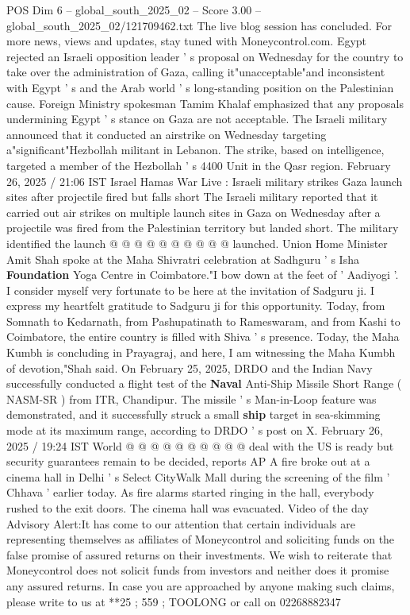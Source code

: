 \begin{textsample}{POS Dim 6 – global\_south\_2025\_02 – Score 3.00 – global\_south\_2025\_02/121709462.txt}  \label{ex:f6_pos_413}
The live blog session has concluded.
For more news, views and updates, stay tuned with Moneycontrol.com.
Egypt rejected an Israeli opposition leader ' s proposal on Wednesday for the country to take over the administration of Gaza, calling it"unacceptable"and inconsistent with Egypt ' s and the Arab world ' s long-standing position on the Palestinian cause.
Foreign Ministry spokesman Tamim Khalaf emphasized that any proposals undermining Egypt ' s stance on Gaza are not acceptable.
The Israeli military announced that it conducted an airstrike on Wednesday targeting a"significant"Hezbollah militant in Lebanon.
The strike, based on intelligence, targeted a member of the Hezbollah ' s 4400 Unit in the Qasr region.
February 26, 2025 / 21:06 IST Israel Hamas War Live : Israeli military strikes Gaza launch sites after projectile fired but falls short The Israeli military reported that it carried out air strikes on multiple launch sites in Gaza on Wednesday after a projectile was fired from the Palestinian territory but landed short.
The military identified the launch @ @ @ @ @ @ @ @ @ @ launched.
Union Home Minister Amit Shah spoke at the Maha Shivratri celebration at Sadhguru ' s Isha \textbf{Foundation} Yoga Centre in Coimbatore."I bow down at the feet of ' Aadiyogi '.
I consider myself very fortunate to be here at the invitation of Sadguru ji.
I express my heartfelt gratitude to Sadguru ji for this opportunity.
Today, from Somnath to Kedarnath, from Pashupatinath to Rameswaram, and from Kashi to Coimbatore, the entire country is filled with Shiva ' s presence.
Today, the Maha Kumbh is concluding in Prayagraj, and here, I am witnessing the Maha Kumbh of devotion,"Shah said.
On February 25, 2025, DRDO and the Indian Navy successfully conducted a flight test of the \textbf{Naval} Anti-Ship Missile Short Range ( NASM-SR ) from ITR, Chandipur.
The missile ' s Man-in-Loop feature was demonstrated, and it successfully struck a small \textbf{ship} target in sea-skimming mode at its maximum range, according to DRDO ' s post on X.
February 26, 2025 / 19:24 IST World @ @ @ @ @ @ @ @ @ @ deal with the US is ready but security guarantees remain to be decided, reports AP A fire broke out at a cinema hall in Delhi ' s Select CityWalk Mall during the screening of the film ' Chhava ' earlier today.
As fire alarms started ringing in the hall, everybody rushed to the exit doors.
The cinema hall was evacuated.
Video of the day Advisory Alert:It has come to our attention that certain individuals are representing themselves as affiliates of Moneycontrol and soliciting funds on the false promise of assured returns on their investments.
We wish to reiterate that Moneycontrol does not solicit funds from investors and neither does it promise any assured returns.
In case you are approached by anyone making such claims, please write to us at **25 ; 559 ; TOOLONG or call on 02268882347

\end{textsample}
